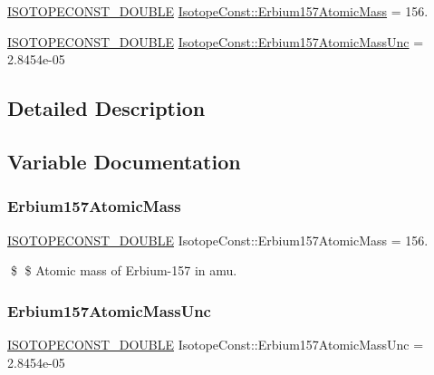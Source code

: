 \begin{DoxyCompactItemize}
\item 
\mbox{\hyperlink{group___isotope_const-_macros_ga8f45a7272ce02c0b4c65c44636ed719a}{I\+S\+O\+T\+O\+P\+E\+C\+O\+N\+S\+T\+\_\+\+D\+O\+U\+B\+LE}} \mbox{\hyperlink{group___isotope_const-_erbium-_er157_ga756c531d7d2269bc91011b301ff3a226}{Isotope\+Const\+::\+Erbium157\+Atomic\+Mass}} = 156.
\item 
\mbox{\hyperlink{group___isotope_const-_macros_ga8f45a7272ce02c0b4c65c44636ed719a}{I\+S\+O\+T\+O\+P\+E\+C\+O\+N\+S\+T\+\_\+\+D\+O\+U\+B\+LE}} \mbox{\hyperlink{group___isotope_const-_erbium-_er157_gae4c3a7d9c53ad2bc2bbf1907b14fc2ee}{Isotope\+Const\+::\+Erbium157\+Atomic\+Mass\+Unc}} = 2.\+8454e-\/05
\end{DoxyCompactItemize}


\subsection{Detailed Description}


\subsection{Variable Documentation}
\mbox{\label{group___isotope_const-_erbium-_er157_ga756c531d7d2269bc91011b301ff3a226}} 
\subsubsection{\texorpdfstring{Erbium157\+Atomic\+Mass}{Erbium157AtomicMass}}
{\footnotesize\ttfamily \mbox{\hyperlink{group___isotope_const-_macros_ga8f45a7272ce02c0b4c65c44636ed719a}{I\+S\+O\+T\+O\+P\+E\+C\+O\+N\+S\+T\+\_\+\+D\+O\+U\+B\+LE}} Isotope\+Const\+::\+Erbium157\+Atomic\+Mass = 156.}

\$ \$ Atomic mass of Erbium-\/157 in amu. \mbox{\label{group___isotope_const-_erbium-_er157_gae4c3a7d9c53ad2bc2bbf1907b14fc2ee}} 
\subsubsection{\texorpdfstring{Erbium157\+Atomic\+Mass\+Unc}{Erbium157AtomicMassUnc}}
{\footnotesize\ttfamily \mbox{\hyperlink{group___isotope_const-_macros_ga8f45a7272ce02c0b4c65c44636ed719a}{I\+S\+O\+T\+O\+P\+E\+C\+O\+N\+S\+T\+\_\+\+D\+O\+U\+B\+LE}} Isotope\+Const\+::\+Erbium157\+Atomic\+Mass\+Unc = 2.\+8454e-\/05}

